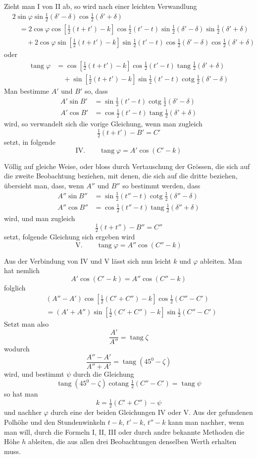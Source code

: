 Zieht man I von II ab, so wird nach einer leichten Verwandlung
\[
\begin{aligned}
&2\sin\varphi\sin\tfrac12(\delta'-\delta)\cos\tfrac12(\delta'+\delta)\\
&\quad=2\cos\varphi\cos[\tfrac12(t+t')-k]\cos\tfrac12(t'-t)\sin\tfrac12(\delta'-\delta)\sin\tfrac12(\delta'+\delta)\\
&\qquad+2\cos\varphi\sin[\tfrac12(t+t')-k]\sin\tfrac12(t'-t)\cos\tfrac12(\delta'-\delta)\cos\tfrac12(\delta'+\delta)
\end{aligned}
\]
oder
\[
\begin{aligned}
\operatorname{tang}\varphi&=\cos[\tfrac12(t+t')-k]\cos\tfrac12(t'-t)\operatorname{tang}\tfrac12(\delta'+\delta)\\
&\quad+\sin[\tfrac12(t+t')-k]\sin\tfrac12(t'-t)\operatorname{cotg}\tfrac12(\delta'-\delta)
\end{aligned}
\]
%
Man bestimme $A'$ und $B'$ so, dass
\[
\begin{aligned}
A'\sin B'&=\sin\tfrac12(t'-t)\operatorname{cotg}\tfrac12(\delta'-\delta)\\
A'\cos B'&=\cos\tfrac12(t'-t)\operatorname{tang}\tfrac12(\delta'+\delta)
\end{aligned}
\]
wird, so verwandelt sich die vorige Gleichung, wenn man zugleich
\[
\tfrac12(t+t')-B'=C'
\]
setzt, in folgende
\[
\mathrm{IV.}\qquad\operatorname{tang}\varphi=A'\cos(C'-k)
\]

Völlig auf gleiche Weise, oder bloss durch Vertauschung der Grössen, die
sich auf die zweite Beobachtung beziehen, mit denen, die sich auf die dritte beziehen,
übersieht man, dass, wenn $A''$ und $B''$ so bestimmt werden, dass
\[
\begin{aligned}
A''\sin B''&=\sin\tfrac12(t''-t)\operatorname{cotg}\tfrac12(\delta''-\delta)\\
A''\cos B''&=\cos\tfrac12(t''-t)\operatorname{tang}\tfrac12(\delta''+\delta)
\end{aligned}
\]
wird, und man zugleich
\[
\tfrac12(t+t'')-B''=C''
\]
setzt, folgende Gleichung sich ergeben wird
\[
\mathrm{V.}\qquad\operatorname{tang}\varphi=A''\cos(C''-k)
\]

Aus der Verbindung von IV und V lässt sich nun leicht $k$ und $\varphi$ ableiten.
Man hat nemlich
\[
A'\cos(C'-k)=A''\cos(C''-k)
\]
folglich
\[
\begin{aligned}
&(A''-A')\cos[\tfrac12(C'+C'')-k]\cos\tfrac12(C''-C')\\
&=(A'+A'')\sin[\tfrac12(C'+C'')-k]\sin\tfrac12(C''-C')
\end{aligned}
\]
Setzt man also
\[
\frac{A'}{A''}=\operatorname{tang}\zeta
\]
wodurch
\[
\frac{A''-A'}{A''+A'}=\operatorname{tang}(45^0-\zeta)
\]
%
wird, und bestimmt $\psi$ durch die Gleichung
\[
\operatorname{tang}(45^0-\zeta)\operatorname{cotang}\tfrac12(C''-C')=\operatorname{tang}\psi
\]
so hat man
\[
k=\tfrac12(C'+C'')-\psi
\]
und nachher $\varphi$ durch eine der beiden Gleichungen IV oder V. Aus der gefundenen
Polhöhe und den Stundenwinkeln $t-k$, $t'-k$, $t''-k$ kann man nachher,
wenn man will, durch die Formeln I, II, III oder durch andre bekannte
Methoden die Höhe $h$ ableiten, die aus allen drei Beobachtungen denselben
Werth erhalten muss.

